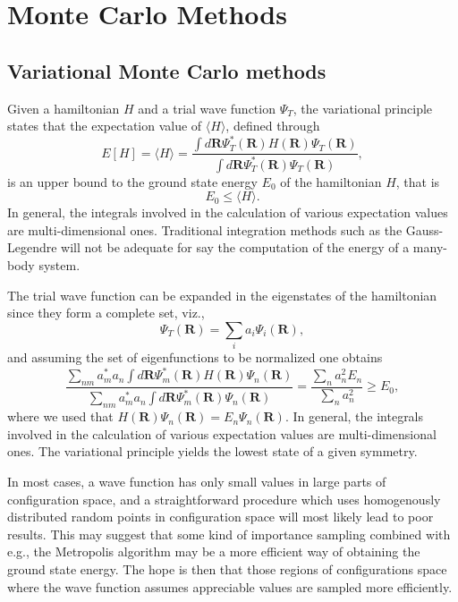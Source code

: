 \documentclass[graybox,sectrefs,envcountresetchap,open=right]{svmonodo}
\begin{document}
\chapter{Monte Carlo Methods}
\label{ch:mc}

\section{Variational Monte Carlo methods}


Given a hamiltonian $H$ and a trial wave function $\Psi_T$, the variational principle states that the expectation value of $\langle H \rangle$, defined through 
\[
   E[H]= \langle H \rangle =
   \frac{\int d\bm{R}\Psi^{\ast}_T(\bm{R})H(\bm{R})\Psi_T(\bm{R})}
        {\int d\bm{R}\Psi^{\ast}_T(\bm{R})\Psi_T(\bm{R})},
\]
is an upper bound to the ground state energy $E_0$ of the hamiltonian $H$, that is 
\[
    E_0 \le \langle H \rangle .
\]
In general, the integrals involved in the calculation of various  expectation values  are multi-dimensional ones. Traditional integration methods such as the Gauss-Legendre will not be adequate for say the  computation of the energy of a many-body system.



The trial wave function can be expanded in the eigenstates of the hamiltonian since they form a complete set, viz.,
\[
   \Psi_T(\bm{R})=\sum_i a_i\Psi_i(\bm{R}),
\]
and assuming the set of eigenfunctions to be normalized one obtains 
\[
     \frac{\sum_{nm}a^*_ma_n \int d\bm{R}\Psi^{\ast}_m(\bm{R})H(\bm{R})\Psi_n(\bm{R})}
        {\sum_{nm}a^*_ma_n \int d\bm{R}\Psi^{\ast}_m(\bm{R})\Psi_n(\bm{R})} =\frac{\sum_{n}a^2_n E_n}
        {\sum_{n}a^2_n} \ge E_0,
\]
where we used that $H(\bm{R})\Psi_n(\bm{R})=E_n\Psi_n(\bm{R})$.
In general, the integrals involved in the calculation of various  expectation
values  are multi-dimensional ones. 
The variational principle yields the lowest state of a given symmetry.



In most cases, a wave function has only small values in large parts of 
configuration space, and a straightforward procedure which uses
homogenously distributed random points in configuration space 
will most likely lead to poor results. This may suggest that some kind
of importance sampling combined with e.g., the Metropolis algorithm 
may be  a more efficient way of obtaining the ground state energy.
The hope is then that those regions of configurations space where
the wave function assumes appreciable values are sampled more 
efficiently. 
\end{document}
